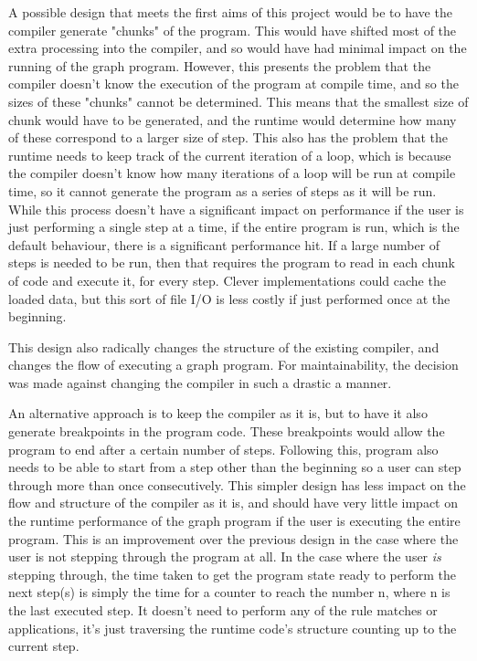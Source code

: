 \documentclass{UoYCSproject}
\begin{document}
A possible design that meets the first aims of this project would be to have the compiler generate "chunks" of the program. This would have shifted most of the extra processing into the compiler, and so would have had minimal impact on the running of the graph program. %
However, this presents the problem that the compiler doesn't know the execution of the program at compile time, and so the sizes of these "chunks" cannot be determined. This means that the smallest size of chunk would have to be generated, and the runtime would determine how many of these correspond to a larger size of step. This also has the problem that the runtime needs to keep track of the current iteration of a loop, which is because the compiler doesn't know how many iterations of a loop will be run at compile time, so it cannot generate the program as a series of steps as it will be run. While this process doesn't have a significant impact on performance if the user is just performing a single step at a time, if the entire program is run, which is the default behaviour, there is a significant performance hit. If a large number of steps is needed to be run, then that requires the program to read in each chunk of code and execute it, for every step. Clever implementations could cache the loaded data, but this sort of file I/O is less costly if just performed once at the beginning.

This design also radically changes the structure of the existing compiler, and changes the flow of executing a graph program. For maintainability, the decision was made against changing the compiler in such a drastic a manner.

An alternative approach is to keep the compiler as it is, but to have it also generate breakpoints in the program code. These breakpoints would allow the program to end after a certain number of steps. Following this, program also needs to be able to start from a step other than the beginning so a user can step through more than once consecutively. This simpler design has less impact on the flow and structure of the compiler as it is, and should have very little impact on the runtime performance of the graph program if the user is executing the entire program. This is an improvement over the previous design in the case where the user is not stepping through the program at all. In the case where the user \emph{is} stepping through, the time taken to get the program state ready to perform the next step(s) is simply the time for a counter to reach the number n, where n is the last executed step. It doesn't need to perform any of the rule matches or applications, it's just traversing the runtime code's structure counting up to the current step. 
\end{document}
